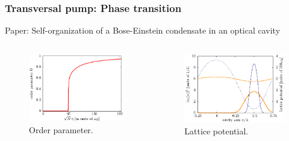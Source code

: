 \documentclass[pdflatex,compress]{beamer}
\begin{document}
\begin{frame}
\frametitle{Transversal pump: Phase transition}
Paper: Self-organization of a Bose-Einstein condensate in an optical cavity \cite{Nagy2008}
\begin{columns}
\begin{figure}
\centering
\includegraphics[width=1\textwidth]{images/domokos_order_parameter.pdf}
\caption{Order parameter.}
\end{figure}
\begin{figure}
\centering
\includegraphics[width=1\textwidth]{images/domokos_lattice_potential.pdf}
\caption{Lattice potential.}
\end{figure}
\end{columns}
\end{frame}
\end{document}
